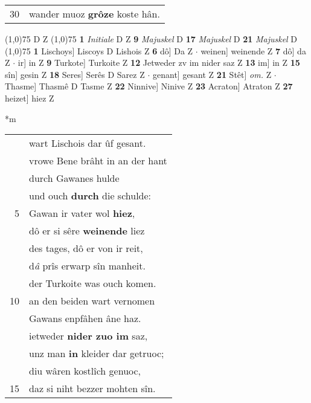 \documentclass[8pt,a4paper,notitlepage]{article}
\begin{document}
\begin{table}[ht]
\begin{minipage}[t]{0.5\linewidth}
\begin{tabular}{rl}
30 & wander muoz \textbf{grôze} koste hân.\\ 
\end{tabular}
\scriptsize
\line(1,0){75} \newline
D Z \newline
\line(1,0){75} \newline
\textbf{1} \textit{Initiale} D Z  \textbf{9} \textit{Majuskel} D  \textbf{17} \textit{Majuskel} D  \textbf{21} \textit{Majuskel} D  \newline
\line(1,0){75} \newline
\textbf{1} Lischoys] Liscoys D Lishois Z \textbf{6} dô] Da Z  $\cdot$ weinen] weinende Z \textbf{7} dô] da Z  $\cdot$ ir] in Z \textbf{9} Turkote] Turkoite Z \textbf{12} Jetweder zv im nider saz Z \textbf{13} im] in Z \textbf{15} sîn] gesin Z \textbf{18} Seres] Serês D Sarez Z  $\cdot$ genant] gesant Z \textbf{21} Stêt] \textit{om.} Z  $\cdot$ Thasme] Thasmê D Tasme Z \textbf{22} Ninnive] Ninive Z \textbf{23} Acraton] Atraton Z \textbf{27} heizet] hiez Z \newline
\end{minipage}
\hspace{0.5cm}
\begin{minipage}[t]{0.5\linewidth}
\small
\begin{center}*m
\end{center}
\begin{tabular}{rl}
 & wart Lischois dar ûf gesant.\\ 
 & vrowe Bene brâht in an der hant\\ 
 & durch Gawanes hulde\\ 
 & und ouch \textbf{durch} die schulde:\\ 
5 & Gawan ir vater wol \textbf{hiez},\\ 
 & dô er si sêre \textbf{weinende} liez\\ 
 & des tages, dô er von ir reit,\\ 
 & d\textit{â} prîs erwarp sîn manheit.\\ 
 & der Turkoite was ouch komen.\\ 
10 & an den beiden wart vernomen\\ 
 & Gawans enpfâhen âne haz.\\ 
 & ietweder \textbf{nider zuo im} saz,\\ 
 & unz man \textbf{in} kleider dar getruoc;\\ 
 & diu wâren kostlîch genuoc,\\ 
15 & daz si niht bezzer mohten sîn.\\ 

\end{tabular}
\end{minipage}
\end{table}
\end{document}
